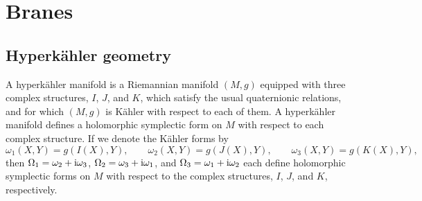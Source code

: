 \section{Branes}
\subsection{Hyperk\"{a}hler geometry}
A hyperk\"{a}hler manifold is a Riemannian manifold $(M,g)$ equipped with three complex structures, $I$, $J$, and $K$, which satisfy the usual quaternionic relations, and for which $(M,g)$ is K\"{a}hler with respect to each of them. A hyperk\"{a}hler manifold defines a holomorphic symplectic form on $M$ with respect to each complex structure. If we denote the K\"{a}hler forms by
\[
\omega_1(X,Y)=g(I(X),Y),\qquad\omega_2(X,Y)=g(J(X),Y),\qquad\omega_3(X,Y)=g(K(X),Y),
\]
then $\Omega_1=\omega_2+{\rm i}\omega_3$, $\Omega_2=\omega_3+{\rm i}\omega_1$, and $\Omega_3=\omega_1+{\rm i}\omega_2$ each define holomorphic symplectic forms on $M$ with respect to the complex structures, $I$, $J$, and $K$, respectively.

